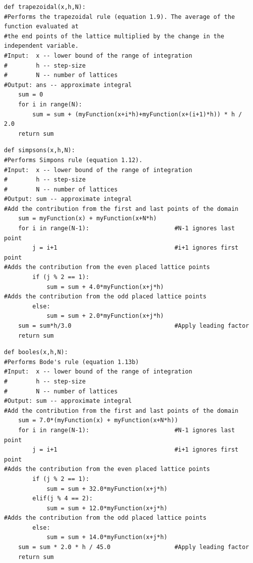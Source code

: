 \documentclass[10pt]{article}
\begin{document}
\begin{lstlisting}
def trapezoidal(x,h,N):
#Performs the trapezoidal rule (equation 1.9). The average of the function evaluated at
#the end points of the lattice multiplied by the change in the independent variable.
#Input:  x -- lower bound of the range of integration
#        h -- step-size
#        N -- number of lattices
#Output: ans -- approximate integral    
    sum = 0
    for i in range(N):
        sum = sum + (myFunction(x+i*h)+myFunction(x+(i+1)*h)) * h / 2.0
    return sum 
\end{lstlisting}
\begin{lstlisting}   
def simpsons(x,h,N):
#Performs Simpons rule (equation 1.12).
#Input:  x -- lower bound of the range of integration
#        h -- step-size
#        N -- number of lattices
#Output: sum -- approximate integral
#Add the contribution from the first and last points of the domain
    sum = myFunction(x) + myFunction(x+N*h)
    for i in range(N-1):						#N-1 ignores last point
        j = i+1        						    #i+1 ignores first point
#Adds the contribution from the even placed lattice points        
        if (j % 2 == 1):
            sum = sum + 4.0*myFunction(x+j*h)
#Adds the contribution from the odd placed lattice points            
        else:
            sum = sum + 2.0*myFunction(x+j*h)                    
    sum = sum*h/3.0                             #Apply leading factor
    return sum
\end{lstlisting}
\begin{lstlisting}
def booles(x,h,N):
#Performs Bode's rule (equation 1.13b)
#Input:  x -- lower bound of the range of integration
#        h -- step-size
#        N -- number of lattices
#Output: sum -- approximate integral 
#Add the contribution from the first and last points of the domain
    sum = 7.0*(myFunction(x) + myFunction(x+N*h))
    for i in range(N-1):						#N-1 ignores last point
        j = i+1        						    #i+1 ignores first point
#Adds the contribution from the even placed lattice points        
        if (j % 2 == 1):
            sum = sum + 32.0*myFunction(x+j*h)
        elif(j % 4 == 2):
            sum = sum + 12.0*myFunction(x+j*h)
#Adds the contribution from the odd placed lattice points            
        else:
            sum = sum + 14.0*myFunction(x+j*h)                    
    sum = sum * 2.0 * h / 45.0                  #Apply leading factor
    return sum
\end{lstlisting}
\end{document}
